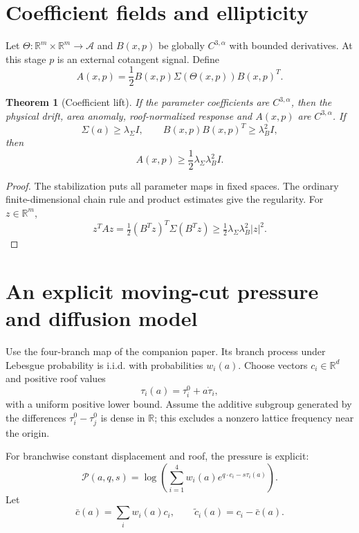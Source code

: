 \documentclass[11pt,reqno]{amsart}
\newtheorem{theorem}{Theorem}[section]
\theoremstyle{definition}
\theoremstyle{remark}
\newcommand{\A}{\mathcal A}
\newcommand{\R}{\mathbb R}
\newcommand{\abs}[1]{\left\lvert #1\right\rvert}
\begin{document}
\section{Coefficient fields and ellipticity}\label{sec:fields}

Let $\Theta:\R^m\times\R^m\to\A$ and $B(x,p)$ be globally $C^{3,\alpha}$
with bounded derivatives.  At this stage $p$ is an external cotangent signal.
Define
\begin{equation}\label{eq:Afield}
 A(x,p)=\frac12B(x,p)\Sigma(\Theta(x,p))B(x,p)^T.
\end{equation}

\begin{theorem}[Coefficient lift]\label{thm:lift}
If the parameter coefficients are $C^{3,\alpha}$, then the physical drift,
area anomaly, roof-normalized response and $A(x,p)$ are $C^{3,\alpha}$.  If
\[
 \Sigma(a)\ge\lambda_\Sigma I,
 \qquad B(x,p)B(x,p)^T\ge\lambda_B^2I,
\]
then
\[
 A(x,p)\ge\frac12\lambda_\Sigma\lambda_B^2I.
\]
\end{theorem}

\begin{proof}
The stabilization puts all parameter maps in fixed spaces.  The ordinary
finite-dimensional chain rule and product estimates give the regularity.  For
$z\in\R^m$,
\[
 z^TAz=\tfrac12(B^Tz)^T\Sigma(B^Tz)
 \ge\tfrac12\lambda_\Sigma\lambda_B^2\abs z^2.
\]
\end{proof}

\section{An explicit moving-cut pressure and diffusion model}\label{sec:actual}

Use the four-branch map of the companion paper.  Its branch process under
Lebesgue probability is i.i.d. with probabilities $w_i(a)$.  Choose vectors
$c_i\in\R^d$ and positive roof values
\[
 \tau_i(a)=\tau_i^0+a\dot\tau_i,
\]
with a uniform positive lower bound.  Assume the additive subgroup generated
by the differences $\tau_i^0-\tau_j^0$ is dense in $\R$; this excludes a
nonzero lattice frequency near the origin.

For branchwise constant displacement and roof, the pressure is explicit:
\begin{equation}\label{eq:explicit-P}
 \mathscr P(a,q,s)
 =\log\left(\sum_{i=1}^4
 w_i(a)e^{q\cdot c_i-s\tau_i(a)}\right).
\end{equation}
Let
\[
 \bar c(a)=\sum_iw_i(a)c_i,
 \qquad \widetilde c_i(a)=c_i-\bar c(a).
\]
\end{document}

